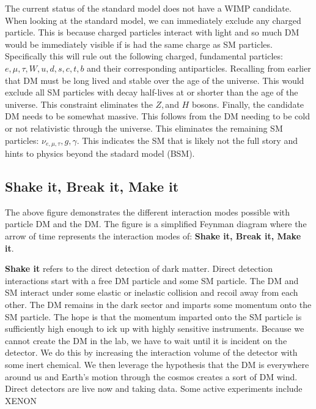 
The current status of the standard model does not have a WIMP candidate.
When looking at the standard model, we can immediately exclude any charged particle.
This is because charged particles interact with light and so much DM would be immediately visible if is had the same charge as SM particles.
Specifically this will rule out the following charged, fundamental particles: $e,\mu, \tau, W, u, d, s, c, t, b$ and their corresponding antiparticles.
Recalling from earlier that DM must be long lived and stable over the age of the universe.
This would exclude all SM particles with decay half-lives at or shorter than the age of the universe.
This constraint eliminates the $Z, $and $H$ bosons.
Finally, the candidate DM needs to be somewhat massive.
This follows from the DM needing to be cold or not relativistic through the universe.
This eliminates the remaining SM particles: $\nu_{e, \mu, \tau}, g, \gamma$.
This indicates the SM that is likely not the full story and hints to physics beyond the stadard model (BSM).


\subsection{Shake it, Break it, Make it\label{sec:bop_it}}


The above figure demonstrates the different interaction modes possible with particle DM and the DM.
The figure is a simplified Feynman diagram where the arrow of time represents the interaction modes of: \textbf{Shake it, Break it, Make it}.

\textbf{Shake it} refers to the direct detection of dark matter.
Direct detection interactions start with a free DM particle and some SM particle.
The DM and SM interact under some elastic or inelastic collision and recoil away from each other.
The DM remains in the dark sector and imparts some momentum onto the SM particle.
The hope is that the momentum imparted onto the SM particle is sufficiently high enough to ick up with highly sensitive instruments.
Because we cannot create the DM in the lab, we have to wait until it is incident on the detector.
We do this by increasing the interaction volume of the detector with some inert chemical.
We then leverage the hypothesis that the DM is everywhere around us and Earth's motion through the cosmos creates a sort of DM wind.
Direct detectors are live now and taking data.
Some active experiments include XENON 

